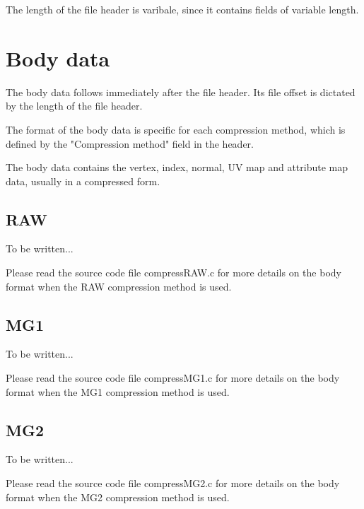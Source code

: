 The length of the file header is varibale, since it contains fields of variable
length.


\section{Body data}
The body data follows immediately after the file header. Its file offset is
dictated by the length of the file header.

The format of the body data is specific for each compression method, which is
defined by the "Compression method" field in the header.

The body data contains the vertex, index, normal, UV map and attribute map
data, usually in a compressed form.


\subsection{RAW}
To be written...

Please read the source code file compressRAW.c for more details on the body
format when the RAW compression method is used.


\subsection{MG1}
To be written...

Please read the source code file compressMG1.c for more details on the body
format when the MG1 compression method is used.


\subsection{MG2}
To be written...

Please read the source code file compressMG2.c for more details on the body
format when the MG2 compression method is used.


